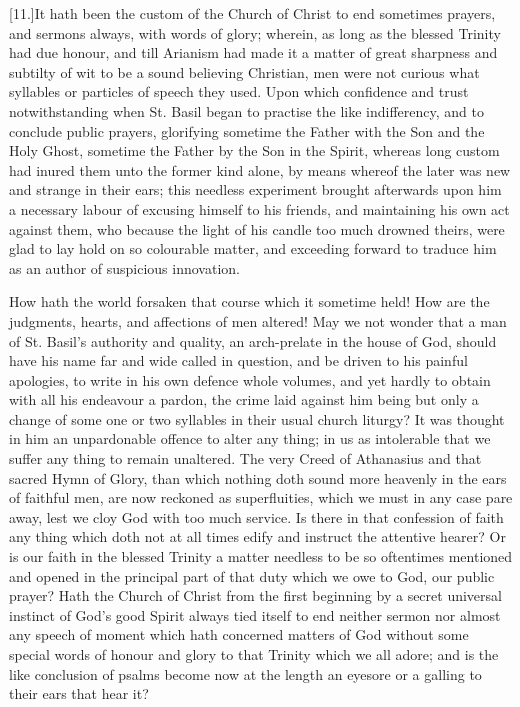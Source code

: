 [11.]It hath been the custom of the Church of Christ to end sometimes prayers, and sermons always, with words of glory; wherein, as long as the blessed Trinity had due honour, and till Arianism had made it a matter of great sharpness and subtilty of wit to be a sound believing Christian, men were not curious what syllables or particles of speech they used. Upon which confidence and trust notwithstanding when St. Basil began to practise the like indifferency, and to conclude public prayers, glorifying sometime the Father with the Son and the Holy Ghost, sometime the Father by the Son in the Spirit, whereas long custom had inured them unto the former kind alone, by means whereof the later was new and strange in their ears; this needless experiment brought afterwards upon him a necessary labour of excusing himself to his friends, and maintaining his own act against them, who because the light of his candle too much drowned theirs, were glad to lay hold on so colourable matter, and exceeding forward to traduce him as an author of suspicious innovation.

How hath the world forsaken that course which it sometime held! How are the judgments, hearts, and affections of men altered! May we not wonder that a man of St. Basil’s authority and quality, an arch-prelate in the house of God, should have his name far and wide called in question, and be  driven to his painful apologies,
 to write in his own defence whole volumes, and yet hardly to obtain with all his endeavour a pardon, the crime laid against him being but only a change of some one or two syllables in their usual church liturgy? It was thought in him an unpardonable offence to alter any thing; in us as intolerable that we suffer any thing to remain unaltered. The very Creed of Athanasius and that sacred Hymn of Glory, than which nothing doth sound more heavenly in the ears of faithful men, are now reckoned as superfluities, which we must in any case pare away, lest we cloy God with too much service. Is there in that confession of faith any thing which doth not at all times edify and instruct the attentive hearer? Or is our faith in the blessed Trinity a matter needless to be so oftentimes mentioned and opened in the principal part of that duty which we owe to God, our public prayer? Hath the Church of Christ from the first beginning by a secret universal instinct of God’s good Spirit always tied itself to end neither sermon nor almost any speech of moment which hath concerned matters of God without some special words of honour and glory to that Trinity which we all adore; and is the like conclusion of psalms become now at the length an eyesore or a galling to their ears that hear it?

